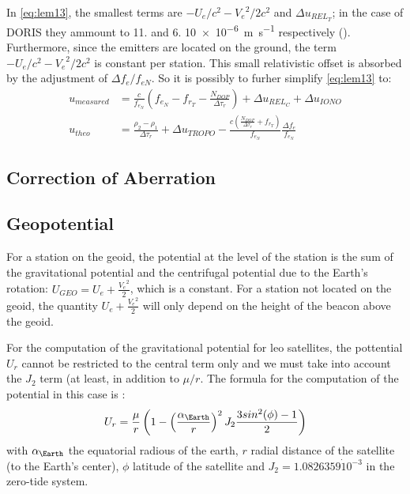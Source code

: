 In \ref{eq:lem13}, the smallest terms are \(-U_e / c^2 - {V_e}^2 / 2 c^2\) and 
\(\Delta u_{{REL}_T}\); in the case of DORIS they ammount to \num{11.} and 
\num{6.} \SI{10e-6}{\meter\per\second} respectively (\cite{lemoine-2016}). 
Furthermore, since the emitters are located on the ground, the term 
\(-U_e / c^2 - {V_e}^2 / 2 c^2\) is constant per station. This small 
relativistic offset is absorbed by the adjustment of \(\Delta f_e / f_{eN}\). 
So it is possibly to furher simplify \ref{eq:lem13} to:
\begin{subequations} \label{eq:lem17}
    \begin{align}
        u_{measured} & = \frac{c}{f_{e_N}} (f_{e_N} - f_{r_T} -
          \frac{N_{DOP}}{\Delta\tau_r}) + 
          \Delta u_{{REL}_C} + \Delta u_{IONO} \label{eq:lem17a}\\
        u_{theo} &= \frac{\rho_2 - \rho_1}{\Delta\tau_r} + \Delta u_{TROPO} - 
          \frac{c(\frac{N_{DOP}}{\Delta\tau_r} + f_{r_T})}{f_{e_N}} 
          \frac{\Delta f_e}{f_{e_N}} \label{eq:lem17b}
    \end{align}
\end{subequations}

\subsection{Correction of Aberration}

\subsection{Geopotential}
For a station on the geoid, the potential at the level of the station is the sum 
of the gravitational potential and the centrifugal potential due to the Earth's 
rotation: \(U_{GEO} = U_e + \frac{{V_e}^2}{2}\), which is a constant. For a station 
not located on the geoid, the quantity \(U_e + \frac{{V_e}^2}{2}\) will only depend 
on the height of the beacon above the geoid.

For the computation of the gravitational potential for \gls{leo} satellites, 
the pottential \(U_r\) cannot be restricted to the central term only and we must 
take into account the \(J_2\) term (at least, in addition to \(\mu / r\). The formula 
for the computation of the potential in this case is \cite{lemoine-2016}:
\begin{equation}
  \label{eq:lem18}
  U_r = \frac{\mu}{r} \left( 1- \left(\frac{\alpha_\Earth}{r}\right)^2 
    J_2 \frac{3 sin^2(\phi) - 1}{2} \right)
\end{equation}
with \(\alpha_\Earth\) the equatorial radious of the earth, \(r\) radial 
distance of the satellite (to the Earth's center), \(\phi\) latitude of the 
satellite and \(J_2 = 1.0826359 \dot 10^{-3}\) in the zero-tide system.

